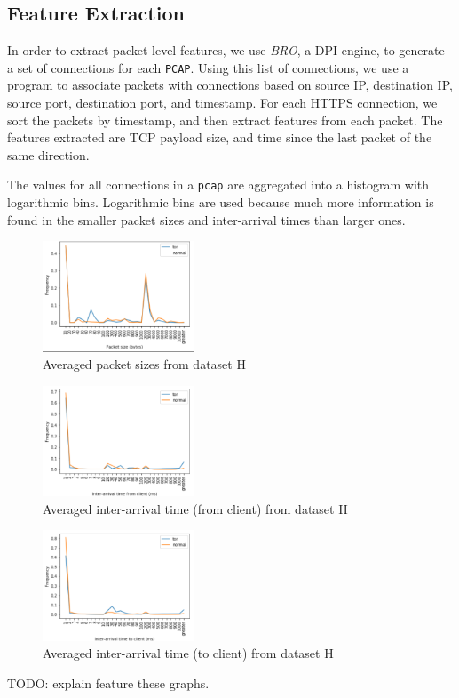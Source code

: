 \subsection{Feature Extraction}
In order to extract packet-level features, we use \textit{BRO}, a DPI engine, to generate a set of connections for each \texttt{PCAP}. Using this list of connections, we use a program to associate packets with connections based on source IP, destination IP, source port, destination port, and timestamp. For each HTTPS connection, we sort the packets by timestamp, and then extract  features from each packet. The features extracted are TCP payload size, and time since the last packet of the same direction.

The values for all connections in a \texttt{pcap} are aggregated into a histogram with logarithmic bins. Logarithmic bins are used because much more information is found in the smaller packet sizes and inter-arrival times than larger ones.

\begin{figure}[H]
    \centering
    \includegraphics[width=0.4\textwidth]{figures/initial-features-packet-size}
    \caption{\label{fig:initial-features-packet-size} Averaged packet sizes from dataset H} 
\end{figure}
\begin{figure}[H]
    \centering
    \includegraphics[width=0.4\textwidth]{figures/initial-features-iaf}
    \caption{\label{fig:initial-features-iaf} Averaged inter-arrival time (from client) from dataset H} 
\end{figure}
\begin{figure}[H]
    \centering
    \includegraphics[width=0.4\textwidth]{figures/initial-features-iat}
    \caption{\label{fig:initial-features-iaf} Averaged inter-arrival time (to client) from dataset H} 
\end{figure}
TODO: explain feature these graphs.
